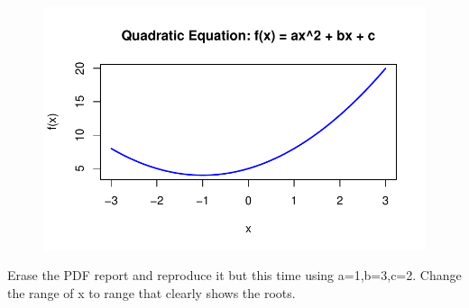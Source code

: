 \documentclass[
  letterpaper,
  DIV=11,
  numbers=noendperiod]{scrartcl}
\begin{document}
\begin{figure}[H]

{\centering \includegraphics{template_files/figure-pdf/unnamed-chunk-3-1.pdf}

}

\end{figure}

Erase the PDF report and reproduce it but this time using a=1,b=3,c=2.
Change the range of x to range that clearly shows the roots.
\end{document}
